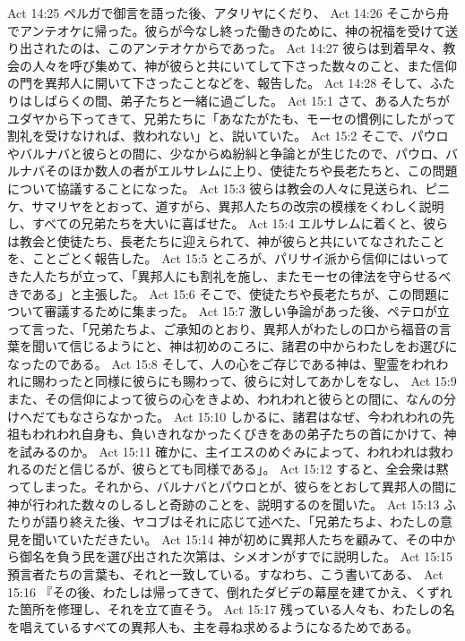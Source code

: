Act 14:25  ペルガで御言を語った後、アタリヤにくだり、
Act 14:26  そこから舟でアンテオケに帰った。彼らが今なし終った働きのために、神の祝福を受けて送り出されたのは、このアンテオケからであった。
Act 14:27  彼らは到着早々、教会の人々を呼び集めて、神が彼らと共にいてして下さった数々のこと、また信仰の門を異邦人に開いて下さったことなどを、報告した。
Act 14:28  そして、ふたりはしばらくの間、弟子たちと一緒に過ごした。
Act 15:1  さて、ある人たちがユダヤから下ってきて、兄弟たちに「あなたがたも、モーセの慣例にしたがって割礼を受けなければ、救われない」と、説いていた。
Act 15:2  そこで、パウロやバルナバと彼らとの間に、少なからぬ紛糾と争論とが生じたので、パウロ、バルナバそのほか数人の者がエルサレムに上り、使徒たちや長老たちと、この問題について協議することになった。
Act 15:3  彼らは教会の人々に見送られ、ピニケ、サマリヤをとおって、道すがら、異邦人たちの改宗の模様をくわしく説明し、すべての兄弟たちを大いに喜ばせた。
Act 15:4  エルサレムに着くと、彼らは教会と使徒たち、長老たちに迎えられて、神が彼らと共にいてなされたことを、ことごとく報告した。
Act 15:5  ところが、パリサイ派から信仰にはいってきた人たちが立って、「異邦人にも割礼を施し、またモーセの律法を守らせるべきである」と主張した。
Act 15:6  そこで、使徒たちや長老たちが、この問題について審議するために集まった。
Act 15:7  激しい争論があった後、ペテロが立って言った、「兄弟たちよ、ご承知のとおり、異邦人がわたしの口から福音の言葉を聞いて信じるようにと、神は初めのころに、諸君の中からわたしをお選びになったのである。
Act 15:8  そして、人の心をご存じである神は、聖霊をわれわれに賜わったと同様に彼らにも賜わって、彼らに対してあかしをなし、
Act 15:9  また、その信仰によって彼らの心をきよめ、われわれと彼らとの間に、なんの分けへだてもなさらなかった。
Act 15:10  しかるに、諸君はなぜ、今われわれの先祖もわれわれ自身も、負いきれなかったくびきをあの弟子たちの首にかけて、神を試みるのか。
Act 15:11  確かに、主イエスのめぐみによって、われわれは救われるのだと信じるが、彼らとても同様である」。
Act 15:12  すると、全会衆は黙ってしまった。それから、バルナバとパウロとが、彼らをとおして異邦人の間に神が行われた数々のしるしと奇跡のことを、説明するのを聞いた。
Act 15:13  ふたりが語り終えた後、ヤコブはそれに応じて述べた、「兄弟たちよ、わたしの意見を聞いていただきたい。
Act 15:14  神が初めに異邦人たちを顧みて、その中から御名を負う民を選び出された次第は、シメオンがすでに説明した。
Act 15:15  預言者たちの言葉も、それと一致している。すなわち、こう書いてある、
Act 15:16  『その後、わたしは帰ってきて、倒れたダビデの幕屋を建てかえ、くずれた箇所を修理し、それを立て直そう。
Act 15:17  残っている人々も、わたしの名を唱えているすべての異邦人も、主を尋ね求めるようになるためである。
